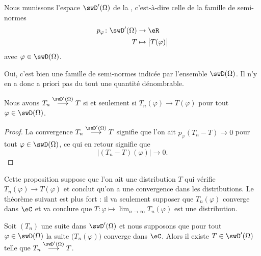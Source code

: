 \begin{definition}        \label{DefASmjVaT}
    Nous munissons l'espace \( \swD'(\Omega)\) de la , c'est-à-dire celle de la famille de semi-normes
    \begin{equation}
        \begin{aligned}
            p_{\varphi}\colon \swD'(\Omega)&\to \eR \\
            T&\mapsto \big| T(\varphi) \big|
        \end{aligned}
    \end{equation}
    avec \( \varphi\in\swD(\Omega)\).
\end{definition}
Oui, c'est bien une famille de semi-normes indicée par l'ensemble \( \swD(\Omega)\). Il n'y en a donc a priori pas du tout une quantité dénombrable.

\begin{proposition}  \label{PropEUIsNhD}
    Nous avons \( T_n\stackrel{\swD'(\Omega)}{\longrightarrow}T\) si et seulement si \( T_n(\varphi)\to T(\varphi)\) pour tout \( \varphi\in\swD(\Omega)\).
\end{proposition}

\begin{proof}
    La convergence \( T_n\stackrel{\swD'(\Omega)}{\longrightarrow}T\) signifie que l'on ait \( p_{\varphi}(T_n-T)\to 0\) pour tout \( \varphi\in\swD(\Omega)\), ce qui en retour signifie que
    \begin{equation}
        \big| (T_n-T)(\varphi) \big|\to 0.
    \end{equation}
\end{proof}
Cette proposition suppose que l'on ait une distribution \( T\) qui vérifie \( T_n(\varphi)\to T(\varphi)\) et conclut qu'on a une convergence dans les distributions. Le théorème suivant est plus fort : il va seulement supposer que \( T_n(\varphi)\) converge dans \( \eC\) et va conclure que \( T\colon \varphi\mapsto \lim_{n\to \infty} T_n(\varphi)\) est une distribution.

\begin{theorem}
    Soit \( (T_n)\) une suite dans \( \swD'(\Omega)\) et nous supposons que pour tout \( \varphi\in\swD(\Omega)\) la suite \( \big( T_n(\varphi) \big)\) converge dans \( \eC\). Alors il existe \( T\in\swD'(\Omega)\) telle que \( T_n\stackrel{\swD'(\Omega)}{\longrightarrow}T\).
\end{theorem}

